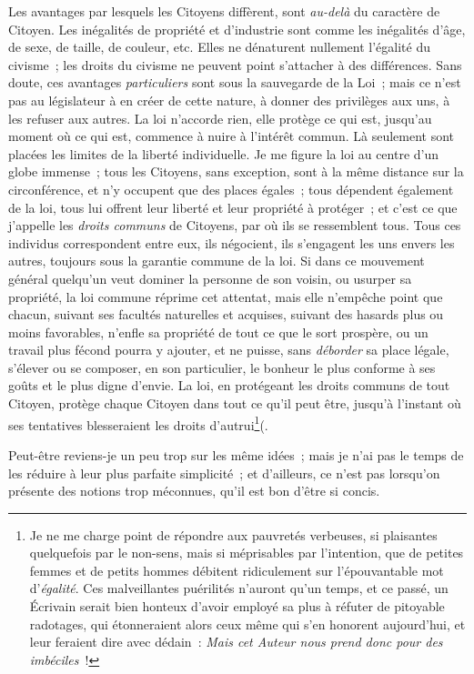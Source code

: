 \documentclass[french,twoside]{book} %
\begin{document}
Les avantages par lesquels les Citoyens diffèrent, sont {\itshape au-delà} du caractère de Citoyen. Les inégalités de propriété et d’industrie sont comme les inégalités d’âge, de sexe, de taille, de couleur, etc. Elles ne dénaturent nullement l’égalité du civisme ; les droits du civisme ne peuvent point s’attacher à des différences. Sans doute, ces avantages {\itshape particuliers} sont sous la sauvegarde de la Loi ; mais ce n’est pas au législateur à en créer de cette nature, à donner des privilèges aux uns, à les refuser aux autres. La loi n’accorde rien, elle protège ce qui est, jusqu’au moment où ce qui est, commence à nuire à l’intérêt commun. Là seulement sont placées les limites de la liberté individuelle. Je me figure la loi au centre d’un globe immense ; tous les Citoyens, sans exception, sont à la même distance sur la circonférence, et n’y occupent que des places égales ; tous dépendent également de la loi, tous lui offrent leur liberté et leur propriété à protéger ; et c’est ce que j’appelle les {\itshape droits communs} de Citoyens, par où ils se ressemblent tous. Tous ces individus correspondent entre eux, ils négocient, ils s’engagent les uns envers les autres, toujours sous la garantie commune de la loi. Si dans ce mouvement général quelqu’un veut dominer la personne de son voisin, ou usurper sa propriété, la loi commune réprime cet attentat, mais elle n’empêche point que chacun, suivant ses facultés naturelles et acquises, suivant des hasards plus ou moins favorables, n’enfle sa propriété de tout ce que le sort prospère, ou un travail plus fécond pourra y ajouter, et ne puisse, sans {\itshape déborder} sa place légale, s’élever ou se composer, en son particulier, le bonheur le plus conforme à ses goûts et le plus digne d’envie. La loi, en protégeant les droits communs de tout Citoyen, protège chaque Citoyen dans tout ce qu’il peut être, jusqu’à l’instant où ses tentatives blesseraient les droits d’autrui\footnote{Je ne me charge point de répondre aux pauvretés verbeuses, si plaisantes quelquefois par le non-sens, mais si méprisables par l’intention, que de petites femmes et de petits hommes débitent ridiculement sur l’épouvantable mot d’{\itshape égalité}. Ces malveillantes puérilités n’auront qu’un temps, et ce passé, un Écrivain serait bien honteux d’avoir employé sa plus à réfuter de pitoyable radotages, qui étonneraient alors ceux même qui s’en honorent aujourd’hui, et leur feraient dire avec dédain : {\itshape Mais cet Auteur nous prend donc pour des imbéciles} !}(.\par
Peut-être reviens-je un peu trop sur les même idées ; mais je n’ai pas le temps de les réduire à leur plus parfaite simplicité ; et d’ailleurs, ce n’est pas lorsqu’on présente des notions trop méconnues, qu’il est bon d’être si concis.\par
\end{document}
